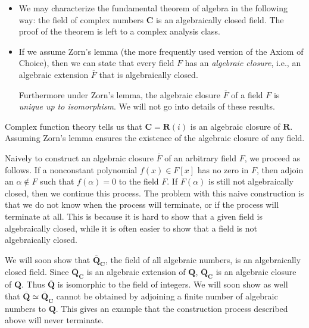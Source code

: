 \documentclass[11pt]{article}
\newcommand{\R}{\mathbf{R}}
\newcommand{\Q}{\mathbf{Q}}
\newcommand{\C}{\mathbf{C}}
\newcommand{\df}[1]{\textit{\textsf{#1}}}
\newcommand{\clos}[1]{\overline{#1}}
\begin{document}
\begin{itemize}
    \item We may characterize the fundamental theorem of algebra in the following way: the field of complex numbers $\C$ is an algebraically closed field. The proof of the theorem is left to a complex analysis class.
    \item If we assume Zorn's lemma (the more frequently used version of the Axiom of Choice), then we can state that every field $F$ has an \df{algebraic closure}, i.e., an algebraic extension $\clos{F}$ that is algebraically closed.
    
    Furthermore under Zorn's lemma, the algebraic closure $\clos{F}$ of a field $F$ is \emph{unique up to isomorphism}. We will not go into details of these results.
\end{itemize}   
\begin{framed}
    Complex function theory tells us that $\C = \R(i)$ is an algebraic closure of $\R$. Assuming Zorn's lemma ensures the existence of the algebraic closure of any field. 

    Naively to construct an algebraic closure $\clos{F}$ of an arbitrary field $F$, we proceed as follows. If a nonconstant polynomial $f(x) \in F[x]$ has no zero in $F$, then adjoin an $\alpha \notin F$ such that $f(\alpha) = 0$ to the field $F$. If $F(\alpha)$ is still not algebraically closed, then we continue this process. The problem with this naive construction is that we do not know when the process will terminate, or if the process will terminate at all. This is because it is hard to show that a given field is algebraically closed, while it is often easier to show that a field is not algebraically closed. 
    
    We will soon show that $\clos{\Q}_\C$, the field of all algebraic numbers, is an algebraically closed field. Since $\clos{\Q}_\C$ is an algebraic extension of $\Q$, $\clos{\Q}_\C$ is an algebraic closure of $\Q$. Thus $\clos{\Q}$ is isomorphic to the field of integers. We will soon show as well that $\clos{\Q} \simeq \clos{\Q}_\C$ cannot be obtained by adjoining a finite number of algebraic numbers to $\Q$. This gives an example that the construction process described above will never terminate.
\end{framed}
\end{document}
